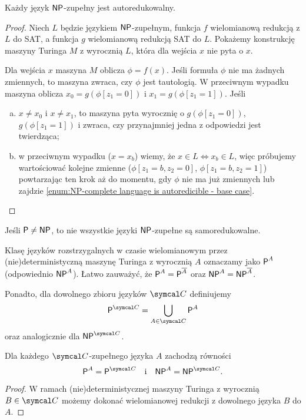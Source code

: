 \begin{theorem}
    Każdy język $\textsf{NP}$-zupełny jest autoredukowalny.
\end{theorem}
\begin{proof}
    Niech $L$ będzie językiem $\textsf{NP}$-zupełnym, funkcja $f$ wielomianową redukcją z $L$ do SAT, a funkcja $g$ wielomianową redukcją SAT do $L$. Pokażemy konstrukcję maszyny Turinga $M$ z wyrocznią $L$, która dla wejścia $x$ nie pyta o $x$.

    Dla wejścia $x$ maszyna $M$ oblicza $\phi = f(x)$. Jeśli formuła $\phi$ nie ma żadnych zmiennych, to maszyna zwraca, czy $\phi$ jest tautologią. W przeciwnym wypadku maszyna oblicza $x_0 = g(\phi[z_1 = 0])$ i $x_1 = g(\phi[z_1 = 1])$. Jeśli
    \begin{enumerate}[(a)]
        \item $x \neq x_0$ i $x \neq x_1$, to maszyna pyta wyrocznię o $g(\phi[z_1 = 0])$, $g(\phi[z_1 = 1])$ i zwraca, czy przynajmniej jedna z odpowiedzi jest twierdząca;\label{enum:NP-complete language is autoredicible - base case}
        \item w przeciwnym wypadku ($x = x_b$) wiemy, że $x \in L \iff x_b \in L$, więc próbujemy wartościować kolejne zmienne ($\phi[z_1 = b, z_2 = 0]$, $\phi[z_1 = b, z_2 = 1]$) powtarzając ten krok aż do momentu, gdy $\phi$ nie ma już zmiennych lub zajdzie \ref{enum:NP-complete language is autoredicible - base case}.
    \end{enumerate}
\end{proof}

\begin{theorem}
    Jeśli $\textsf{P} \neq \textsf{NP}$, to nie wszystkie języki $\textsf{NP}$-zupełne są samoredukowalne.
\end{theorem}

Klasę języków rozstrzygalnych w czasie wielomianowym przez (nie)deterministyczną maszynę Turinga z wyrocznią $A$ oznaczamy jako $\textsf{P}^A$ (odpowiednio $\textsf{NP}^A$). Łatwo zauważyć, że $\textsf{P}^A = \textsf{P}^{\overline{A}}$ oraz $\textsf{NP}^A = \textsf{NP}^{\overline{A}}$.

Ponadto, dla dowolnego zbioru języków $\sC$ definiujemy
\[ \Pclass^\sC = \bigcup_{A\in\sC} \Pclass^A \]
oraz analogicznie dla $\NPclass^\sC$.

\begin{fact}
    Dla każdego $\sC$-zupełnego języka $A$ zachodzą równości
    \[ \Pclass^A = \Pclass^\sC \quad\text{i}\quad \NPclass^A = \NPclass^\sC. \]
\end{fact}
\begin{proof}
    W ramach (nie)deterministycznej maszyny Turinga z wyrocznią $B \in \sC$ możemy dokonać wielomianowej redukcji z dowolnego języka $B$ do $A$.
\end{proof}

